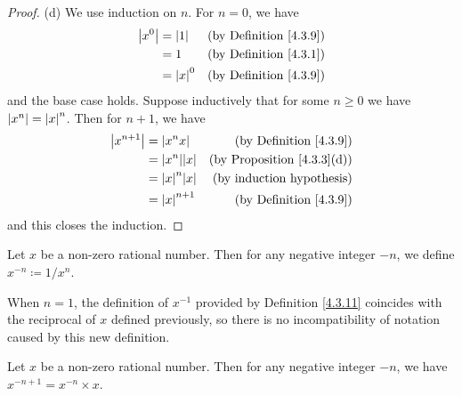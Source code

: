 \begin{proof}{(d)}
    We use induction on \(n\).
    For \(n = 0\), we have
    \begin{align*}
        \left\lvert x^0\right\rvert & = \left\lvert1\right\rvert   & \text{(by Definition \ref{4.3.9})} \\
                  & = 1         & \text{(by Definition \ref{4.3.1})} \\
                  & = \left\lvert x\right\rvert^0 & \text{(by Definition \ref{4.3.9})}
    \end{align*}
    and the base case holds.
    Suppose inductively that for some \(n \geq 0\) we have \(\left\lvert x^n\right\rvert = \left\lvert x\right\rvert^n\).
    Then for \(n + 1\), we have
    \begin{align*}
        \abs{x^{n + 1}} & = \abs{x^n x}       & \text{(by Definition \ref{4.3.9})}     \\
                        & = \abs{x^n} \abs{x} & \text{(by Proposition \ref{4.3.3}(d))} \\
                        & = \abs{x}^n \abs{x} & \text{(by induction hypothesis)}       \\
                        & = \abs{x}^{n + 1}   & \text{(by Definition \ref{4.3.9})}
    \end{align*}
    and this closes the induction.
\end{proof}

\begin{definition}\label{4.3.11}
    Let \(x\) be a non-zero rational number.
    Then for any negative integer \(-n\), we define \(x^{-n} \coloneqq 1 / x^n\).
\end{definition}

\begin{note}
    When \(n = 1\), the definition of \(x^{-1}\) provided by Definition \ref{4.3.11} coincides with the reciprocal of \(x\) defined previously, so there is no incompatibility of notation caused by this new definition.
\end{note}

\begin{additional corollary}\label{ac 4.3.2}
Let \(x\) be a non-zero rational number.
Then for any negative integer \(-n\), we have \(x^{-n + 1} = x^{-n} \times x\).
\end{additional corollary}

